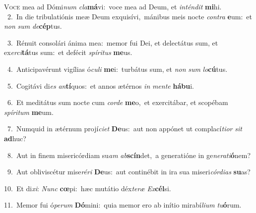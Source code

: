\lettrine{\initial\textcolor{\initialcolor}{V}}{oce} mea ad Dómi\textit{num} \textit{cla}\-\textbf{má}vi:~\star voce mea ad Deum, et \textit{in}\-\textit{tén}\textit{dit} \textbf{mi}\-hi.\\
{\numbfont\textcolor{\numbcolor}{~2.}}~In die tribulatiónis meæ Deum exquisívi,~\dagger mánibus meis nocte \textit{con}\-\textit{tra} \textbf{e}\-um:~\star et \textit{non} \textit{sum} \textit{de}\-\textbf{cép}tus.\par
{\numbfont\textcolor{\numbcolor}{~3.}}~Rénuit consolári ánima mea:~\dagger memor fui Dei, et delectátus sum, et ex\-\textit{er}\-\textit{ci}\textbf{tá}tus sum:~\star et defécit \textit{spí}\-\textit{ri}\textit{tus} \textbf{me}\-us.\par
{\numbfont\textcolor{\numbcolor}{~4.}}~Anticipavérunt vigílias ó\-\textit{cu}\-\textit{li} \textbf{me}\-i:~\star turbátus sum, et \textit{non} \textit{sum} \textit{lo}\-\textbf{cú}tus.\par
{\numbfont\textcolor{\numbcolor}{~5.}}~Cogitávi di\textit{es} \textit{an}\-\textbf{tí}quos:~\star et annos ætérnos \textit{in} \textit{men}\-\textit{te} \textbf{há}\-\textbf{bu}i.\par
{\numbfont\textcolor{\numbcolor}{~6.}}~Et meditátus sum nocte cum \textit{cor}\-\textit{de} \textbf{me}\-o,~\star et exercitábar, et scopébam \textit{spí}\-\textit{ri}\textit{tum} \textbf{me}\-um.\par
{\numbfont\textcolor{\numbcolor}{~7.}}~Numquid in ætérnum projí\-\textit{ci}\-\textit{et} \textbf{De}\-us:~\star aut non appónet ut complací\-\textit{ti}\-\textit{or} \textit{sit} \textbf{ad}\-huc?\par
{\numbfont\textcolor{\numbcolor}{~8.}}~Aut in finem misericórdiam su\textit{am} \textit{ab}\-\textbf{scín}det,~\star a generatióne in ge\-\textit{ne}\-\textit{ra}\textit{ti}\textbf{ó}nem?\par
{\numbfont\textcolor{\numbcolor}{~9.}}~Aut obliviscétur mise\-\textit{ré}\-\textit{ri} \textbf{De}\-us:~\star aut continébit in ira sua miseri\-\textit{cór}\-\textit{di}\textit{as} \textbf{su}\-as?\par
{\numbfont\textcolor{\numbcolor}{10.}}~Et di\-\textit{xi}\-: \textit{Nunc} \textbf{cœ}\-pi:~\star hæc mutátio déx\-\textit{te}\-\textit{ræ} \textit{Ex}\-\textbf{cél}si.\par
{\numbfont\textcolor{\numbcolor}{11.}}~Memor fui ó\-\textit{pe}\-\textit{rum} \textbf{Dó}\-mini:~\star quia memor ero ab inítio mirabí\-\textit{li}\-\textit{um} \textit{tu}\-\textbf{ó}rum.\par
